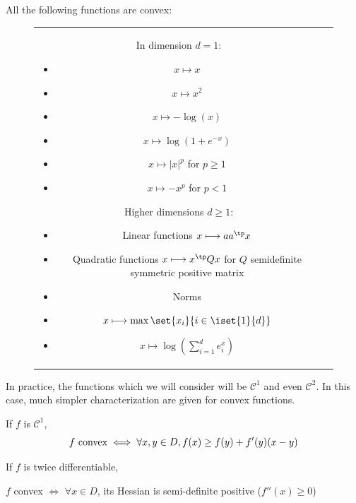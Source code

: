 \documentclass{../cs-classes/cs-classes}
\begin{document}
\begin{example}
    \leavevmode
    All the following functions are convex:
    \begin{figure}[H]
        \centering
        \begin{tabular}{c c}
            \begin{minipage}{0.45\textwidth}
                \vspace*{-0.4cm}
                In dimension $d=1$:
                \begin{itemize}
                    \item $x\longmapsto x$
                    \item $x\longmapsto x^2$
                    \item $x\longmapsto -\log(x)$
                    \item $x\longmapsto \log(1+e^{-x})$
                    \item $x\longmapsto |x|^p$ for $p\geq1$
                    \item $x\longmapsto -x^p$ for $p<1$
                \end{itemize}
            \end{minipage}
            \begin{minipage}{0.5\textwidth}
                Higher dimensions $d\geq1$:
                \begin{itemize}
                    \item Linear functions $x\longmapsto aa^\tp x$
                    \item Quadratic functions $x\longmapsto x^\tp Qx$ for $Q$ semidefinite symmetric positive matrix
                    \item Norms
                    \item $x\longmapsto\max\set{x_i}{i\in\iset{1}{d}}$
                    \item $x\longmapsto\log\left(\sum_{i=1}^de_i^x\right)$
                \end{itemize}
            \end{minipage}
        \end{tabular}
    \end{figure}
\end{example}

In practice, the functions which we will consider will be $\mathcal{C}^1$ and even $\mathcal{C}^2$. In this case, much simpler characterization are given for convex functions.

\begin{property}
    If $f$ is $\mathcal{C}^1$,
    \begin{equation*}
        f \textnormal{ convex} \iff \forall x, y\in D, f(x)\geq f(y) + f'(y)(x-y)
    \end{equation*}
\end{property}
\begin{property}
    If $f$ is twice differentiable,
    \begin{center}
        $f$ convex $\iff$ $\forall x\in D$, its Hessian is semi-definite positive ($f''(x)\geq0$)
    \end{center}
\end{property}
\end{document}
